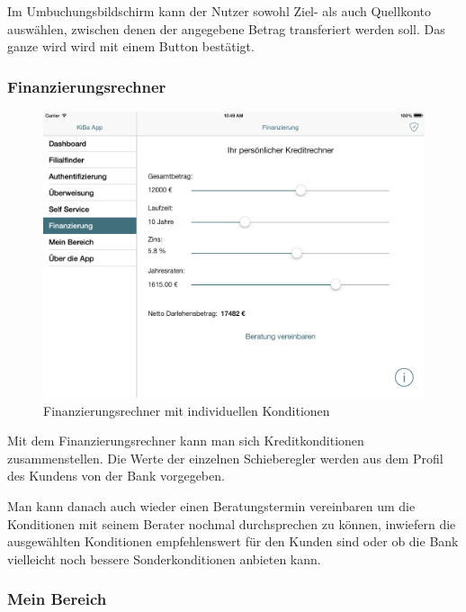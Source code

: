 	Im Umbuchungsbildschirm kann der Nutzer sowohl Ziel- als auch Quellkonto auswählen, zwischen denen der angegebene Betrag transferiert werden soll. Das ganze wird wird mit einem Button bestätigt.

\subsubsection{Finanzierungsrechner}
\begin{figure}[h]
	\centering
  \includegraphics[scale=0.4]{Pictures/finanzierung}
	\caption{Finanzierungsrechner mit individuellen Konditionen}
	\label{fig9}
\end{figure}

	Mit dem Finanzierungsrechner kann man sich Kreditkonditionen zusammenstellen. Die Werte der einzelnen Schieberegler werden aus dem Profil des Kundens von der Bank vorgegeben.

	Man kann danach auch wieder einen Beratungstermin vereinbaren um die Konditionen mit seinem Berater nochmal durchsprechen zu können, inwiefern die ausgewählten Konditionen empfehlenswert für den Kunden sind oder ob die Bank vielleicht noch bessere Sonderkonditionen anbieten kann.

\subsubsection{Mein Bereich}

